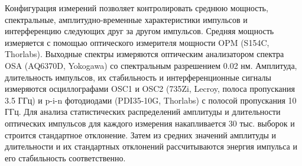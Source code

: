 Конфигурация измерений позволяет контролировать среднюю мощность, спектральные, амплитудно-временные характеристики импульсов и интерференцию следующих друг за другом импульсов. Средняя мощность измеряется с помощью оптического измерителя мощности OPM (S154C, Thorlabs). Выходные спектры измеряются оптическим анализатором спектра OSA (AQ6370D, Yokogawa) со спектральным разрешением 0.02 нм. Амплитуда, длительность импульсов, их стабильность и интерференционные сигналы измеряются осциллографами OSC1 и OSC2 (735Zi, Lecroy, полоса пропускания 3.5 ГГц) и p-i-n фотодиодами (PDI35-10G, Thorlabs) с полосой пропускания 10 ГГц. Для анализа статистических распределений амплитуды и длительности оптических импульсов для каждого измерения накапливается 30 тыс. выборок и строится стандартное отклонение. Затем из средних значений амплитуды и длительности и их стандартных отклонений рассчитываются энергия импульса и его стабильность соответственно.
